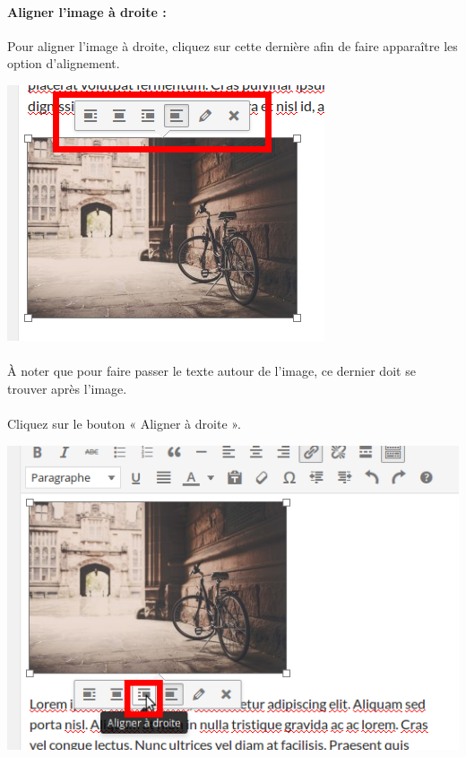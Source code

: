 \documentclass[10pt,a4paper]{article}
\begin{document}
\paragraph{Aligner l'image à droite : }Pour aligner l'image à droite, cliquez sur cette dernière afin de faire apparaître les option d'alignement.
\begin{center}
\includegraphics[scale=0.3]{img/0107.png}
\end{center}
\paragraph{}À noter que pour faire passer le texte autour de l'image, ce dernier doit se trouver après l'image.
\paragraph{}Cliquez sur le bouton « Aligner à droite ».
\begin{center}
\includegraphics[scale=0.3]{img/0112.png}
\end{center}
\end{document}
